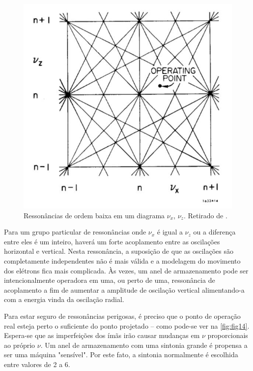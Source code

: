 \begin{figure}[!htb]
	\centering
	\includegraphics[width=0.6\linewidth]{./Figuras/fig14.jpeg}
	\caption{Ressonâncias de ordem baixa em um diagrama $\nu_x$, $\nu_z$. Retirado de \cite{sands1970physics}.}
	\label{fig:fig14}
\end{figure}

Para um grupo particular de ressonâncias onde $\nu_x$ é igual a $\nu_z$ ou a diferença entre eles é um inteiro, haverá um forte acoplamento entre as oscilações horizontal e vertical. Nesta ressonância, a suposição de que as oscilações são completamente independentes não é mais válida e a modelagem do movimento dos elétrons fica mais complicada. Às vezes, um anel de armazenamento pode ser intencionalmente operadora em uma, ou perto de uma, ressonância de acoplamento a fim de aumentar a amplitude de oscilação vertical alimentando-a com a energia vinda da oscilação radial.

Para estar seguro de ressonâncias perigosas, é preciso que o ponto de operação real esteja perto o suficiente do ponto projetado -- como pode-se ver na \autoref{fig:fig14}. Espera-se que as imperfeições dos ímãs irão causar mudanças em $\nu$ proporcionais ao próprio $\nu$. Um anel de armazenamento com uma sintonia grande é propensa a ser uma máquina "sensível". Por este fato, a sintonia normalmente é escolhida entre valores de 2 a 6.